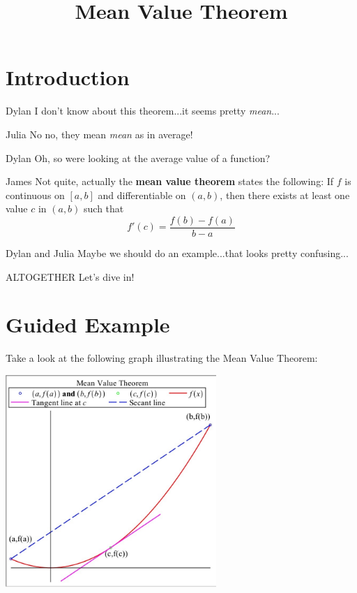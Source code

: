 \documentclass{ximera}
\title{Mean Value Theorem}
\begin{document}
\maketitle

\section{Introduction}

\begin{dialogue}
\item[Dylan] I don't know about this theorem...it seems pretty \textit{mean}...
\item[Julia] No no, they mean \textit{mean} as in average!
\item[Dylan] Oh, so were looking at the average value of a function?
\item[James] Not quite, actually the \textbf{mean value theorem} states the following: If $f$ is continuous on $[a,b]$ and differentiable on $(a,b)$, then there exists at least one value $c$ in $(a,b)$ such that $$f'(c)=\frac{f(b)-f(a)}{b-a}$$
\item[Dylan and Julia] Maybe we should do an example...that looks pretty confusing...
\item[ALTOGETHER] Let's dive in!
\end{dialogue}

\section{Guided Example}

Take a look at the following graph illustrating the Mean Value Theorem:

\begin{image}
    \includegraphics[width=80mm]{meanvalue.jpg}
\end{image}
\end{document}
